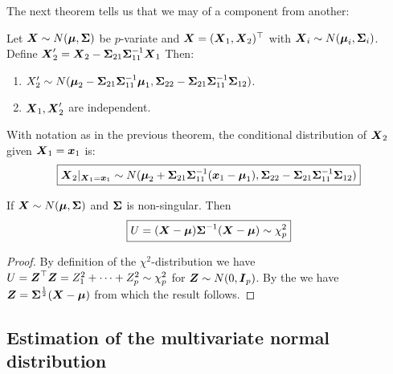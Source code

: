 The next theorem tells us that we may  of a component from another:
\begin{theorem}
    Let $\X\sim N(\M, \SS)$ be $p$-variate and $\X=(\X_1,\X_2)^\top$ with $\X_i\sim N(\M_i, \SS_i)$. Define $\X_2' = \X_2 - \SS_{21}\SS_{11}^{-1} \X_1$ Then:
    \begin{enumerate}
        \item $X_2'\sim N(\M_2 - \SS_{21}\SS_{11}^{-1}\M_1, \SS_{22} - \SS_{21}\SS_{11}^{-1}\SS_{12})$.
        \item $\X_1, \X_2'$ are independent.
    \end{enumerate}
\end{theorem}

\begin{theorem}
    With notation as in the previous theorem, the conditional distribution of $\X_2$ given $\X_1=\x_1$ is:
    \begin{equation}
        \boxed{
            \X_2 |_{\X_1 = \x_1} \sim N(\M_2 + \SS_{21}\SS_{11}^{-1}(\x_1-\M_1), \SS_{22}-\SS_{21}\SS_{11}^{-1}\SS_{12})
        }    
    \end{equation}
\end{theorem}

\begin{theorem}
    If $\X\sim N(\M, \SS)$ and $\SS$ is non-singular. Then 
    \begin{equation}
        \boxed{U = (\X-\M)\SS^{-1}(\X-\M) \sim \chi^2_p}        
    \end{equation}
\end{theorem}
\begin{proof}
    By definition of the $\chi^2$-distribution we have $U=\Z^\top\Z=Z_1^2+\dots+Z_p^2 \sim \chi_p^2$ for $\Z\sim N(0, \mI_p)$. By the  we have $\Z=\SS^{\frac{1}{2}}(\X-\M)$ from which the result follows. 
\end{proof}


\subsection{Estimation of the multivariate normal distribution}
